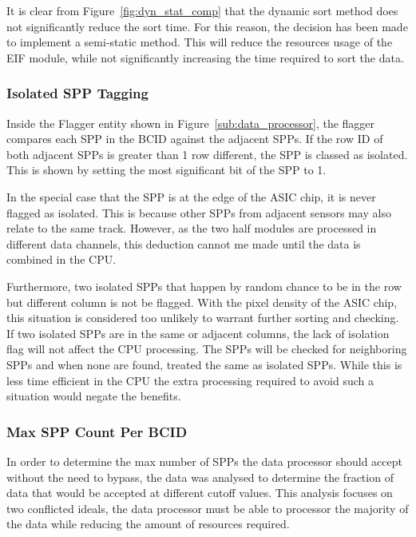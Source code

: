			It is clear from Figure~\ref{fig:dyn_stat_comp} that the dynamic sort method does not significantly reduce the sort time.
			For this reason, the decision has been made to implement a semi-static method.
			This will reduce the resources usage of the EIF module, while not significantly increasing the time required to sort the data.


			\subsubsection{Isolated SPP Tagging} %
			\label{sub:isolated_spp_tagging}
			
			Inside the Flagger entity shown in Figure~\ref{sub:data_processor}, the flagger compares each SPP in the BCID against the adjacent SPPs.
			If the row ID of both adjacent SPPs is greater than 1 row different, the SPP is classed as isolated.
			This is shown by setting the most significant bit of the SPP to 1.

			In the special case that the SPP is at the edge of the ASIC chip, it is never flagged as isolated.
			This is because other SPPs from adjacent sensors may also relate to the same track.
			However, as the two half modules are processed in different data channels, this deduction cannot me made until the data is combined in the CPU.

			Furthermore, two isolated SPPs that happen by random chance to be in the row but different column is not be flagged.
			With the pixel density of the ASIC chip, this situation is considered too unlikely to warrant further sorting and checking.
			If two isolated SPPs are in the same or adjacent columns, the lack of isolation flag will not affect the CPU processing.
			The SPPs will be checked for neighboring SPPs and when none are found, treated the same as isolated SPPs.
			While this is less time efficient in the CPU the extra processing required to avoid such a situation would negate the benefits.

			\subsubsection{Max SPP Count Per BCID} %
			\label{sub:max_spp_count_per_bcid}
			
			In order to determine the max number of SPPs the data processor should accept without the need to bypass, the data was analysed to determine the fraction of data that would be accepted at different cutoff values.
			This analysis focuses on two conflicted ideals, the data processor must be able to processor the majority of the data while reducing the amount of resources required.

